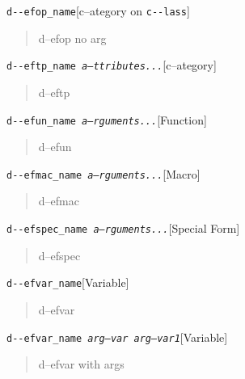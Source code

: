\documentclass{book}
\begin{document}
\noindent\texttt{d{-}{-}efop\_name}\hfill[c--ategory on \texttt{c{-}{-}lass}]



%
\begin{quote}
d--efop no arg
\end{quote}

\noindent\texttt{d{-}{-}eftp\_name \EmbracOn{}\textnormal{\textsl{a--ttributes...}}\EmbracOff{}}\hfill[c--ategory]



%
\begin{quote}
d--eftp
\end{quote}

\noindent\texttt{d{-}{-}efun\_name \EmbracOn{}\textnormal{\textsl{a--rguments...}}\EmbracOff{}}\hfill[Function]



%
\begin{quote}
d--efun
\end{quote}

\noindent\texttt{d{-}{-}efmac\_name \EmbracOn{}\textnormal{\textsl{a--rguments...}}\EmbracOff{}}\hfill[Macro]



%
\begin{quote}
d--efmac
\end{quote}

\noindent\texttt{d{-}{-}efspec\_name \EmbracOn{}\textnormal{\textsl{a--rguments...}}\EmbracOff{}}\hfill[Special Form]



%
\begin{quote}
d--efspec
\end{quote}

\noindent\texttt{d{-}{-}efvar\_name}\hfill[Variable]



%
\begin{quote}
d--efvar
\end{quote}

\noindent\texttt{d{-}{-}efvar\_name \EmbracOn{}\textnormal{\textsl{arg--var arg--var1}}\EmbracOff{}}\hfill[Variable]



%
\begin{quote}
d--efvar with args
\end{quote}
\end{document}
